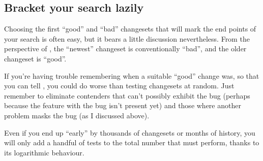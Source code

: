 \subsection{Bracket your search lazily}

Choosing the first ``good'' and ``bad'' changesets that will mark the
end points of your search is often easy, but it bears a little
discussion nevertheless.  From the perspective of , the
``newest'' changeset is conventionally ``bad'', and the older
changeset is ``good''.

If you're having trouble remembering when a suitable ``good'' change
was, so that you can tell , you could do worse than
testing changesets at random.  Just remember to eliminate contenders
that can't possibly exhibit the bug (perhaps because the feature with
the bug isn't present yet) and those where another problem masks the
bug (as I discussed above).

Even if you end up ``early'' by thousands of changesets or months of
history, you will only add a handful of tests to the total number that
 must perform, thanks to its logarithmic behaviour.

